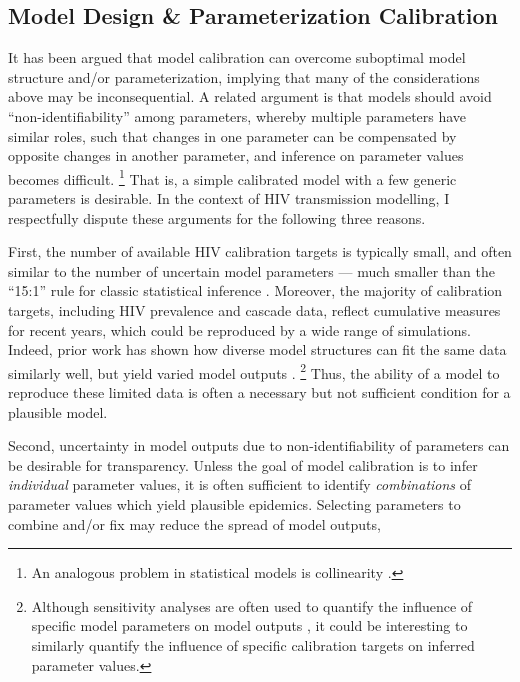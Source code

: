 \subsection{Model Design \& Parameterization \vs Calibration}\label{conc.future.cal}
It has been argued that model calibration can overcome
suboptimal model structure and/or parameterization, implying that
many of the considerations above may be inconsequential.
A related argument is that models should avoid ``non-identifiability'' among parameters,
whereby multiple parameters have similar roles, such that
changes in one parameter can be compensated by opposite changes in another parameter, and
inference on parameter values becomes difficult.%
\footnote{An analogous problem in statistical models is collinearity \cite{Harrell2015}.}
That is, a simple calibrated model with a few generic parameters is desirable.
In the context of HIV transmission modelling,
I respectfully dispute these arguments for the following three reasons.
\par
First, the number of available HIV calibration targets is typically small,
and often similar to the number of uncertain model parameters
--- \ie much smaller than the ``15:1'' rule for classic statistical inference \cite{Harrell2015}.
Moreover, the majority of calibration targets, including HIV prevalence and cascade data,
reflect cumulative measures for recent years,
which could be reproduced by a wide range of simulations.
Indeed, prior work has shown how diverse model structures can fit the same data similarly well,
but yield varied model outputs \cite{Hontelez2013,Eaton2015,Bernard2017,Suen2017}.%
\footnote{Although sensitivity analyses are often used to quantify the influence of
  specific model parameters on model outputs \cite{Blower1994,Johnson2016cc},
  it could be interesting to similarly quantify the influence of
  specific calibration targets on inferred parameter values.}
Thus, the ability of a model to reproduce these limited data
is often a necessary but not sufficient condition for a plausible model.
\par
Second, uncertainty in model outputs due to non-identifiability of parameters
can be desirable for transparency.
Unless the goal of model calibration is to infer \emph{individual} parameter values,
it is often sufficient to identify \emph{combinations} of parameter values
which yield plausible epidemics.
Selecting parameters to combine and/or fix may reduce the spread of model outputs,
